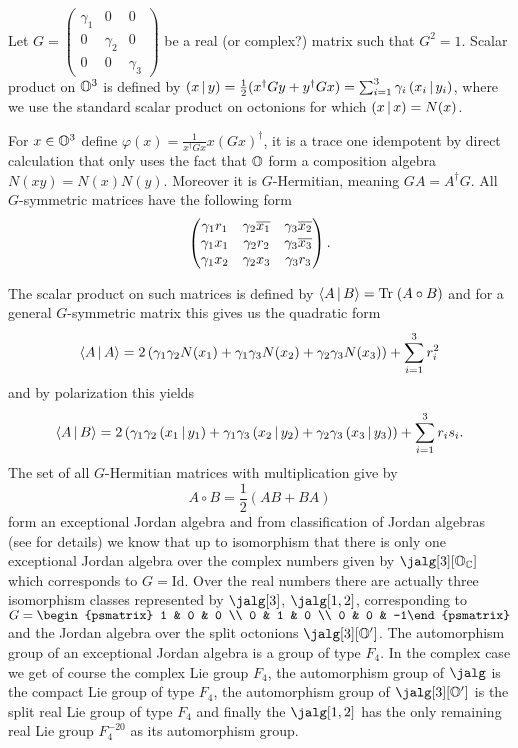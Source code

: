 Let $G = \begin{pmatrix} \gamma_1 & 0 & 0\\ 0 & \gamma_2 & 0\\ 0 & 0 & \gamma_3\end{pmatrix}$ be a real (or complex?) matrix such that $G^2 = 1$. Scalar product on $\mathbb{O}^3$ is defined by $\left( x \,|\, y \right) = \frac{1}{2}(x^\dagger G y + y^\dagger G x) = \sum_{i=1}^3 \gamma_i\left( x_i \,|\, y_i \right)$, where we use the standard scalar product on octonions for which $\left( x \,|\, x \right) = N(x)$.

 For $x\in\mathbb{O}^3$ define $\varphi (x) = \frac{1}{x^\dagger G x} x (Gx)^\dagger$, it is a trace one idempotent by direct calculation that only uses the fact that $\mathbb{O}$ form a composition algebra $N(xy) = N(x)N(y)$. Moreover it is $G$-Hermitian, meaning $GA=A^\dagger G$. All $G$-symmetric matrices have the following form
\begin{equation}\label{g-matrix}
  \begin{pmatrix}
  \gamma_1 r_1 & \gamma_2 \overline{x_1} & \gamma_3 \overline{x_2} \\
  \gamma_1 x_1 & \gamma_2 r_2 & \gamma_3 \overline{x_3} \\
  \gamma_1 x_2 & \gamma_2 x_3 & \gamma_3 r_3
  \end{pmatrix}.
\end{equation}

The scalar product on such matrices is defined by $\langle A\,|\, B \rangle = \mathrm{Tr}\; (A \circ B)$ and for a general $G$-symmetric matrix this gives us the quadratic form
\[
	\langle A\,|\, A \rangle = 2\left( \gamma_1\gamma_2 N(x_1) + \gamma_1\gamma_3 N(x_2) + \gamma_2\gamma_3 N(x_3)\right) + \sum_{i=1}^{3} r_i^2
\]
and by polarization this yields
\begin{equation}\label{eq:jscal1}
\langle A\,|\, B \rangle = 2\left( \gamma_1\gamma_2 \left( x_1 \,|\, y_1 \right) + \gamma_1\gamma_3 \left( x_2 \,|\, y_2 \right) + \gamma_2\gamma_3\left( x_3 \,|\, y_3 \right) \right) + \sum_{i=1}^3 r_i s_i.
\end{equation}
The set of all $G$-Hermitian matrices with multiplication give by
\[
A \circ B = \frac{1}{2}(AB+BA)
\]
form an exceptional Jordan algebra and from classification of Jordan algebras (see \cite{springer_octonions_2000} for details) we know that up to isomorphism that there is only one exceptional Jordan algebra over the complex numbers given by $\jalg[3][\octo_\complex]$ which corresponds to $G=\mathrm{Id}$. Over the real numbers there are actually three isomorphism classes represented by $\jalg[3]$, $\jalg[1,2]$, corresponding to $G = \begin{psmatrix} 1 & 0 & 0 \\ 0 & 1 & 0 \\ 0 & 0 & -1\end{psmatrix}$ and the Jordan algebra over the split octonions $\jalg[3][\octo']$. The automorphism group of an exceptional Jordan algebra is a group of type $F_4$. In the complex case we get of course the complex Lie group $F_4$, the automorphism group of $\jalg$ is the compact Lie group of type $F_4$, the automorphism group of $\jalg[3][\octo']$ is the split real Lie group of type $F_4$ and finally the $\jalg[1,2]$ has the only remaining real Lie group $F_4^{-20}$ as its automorphism group. 

